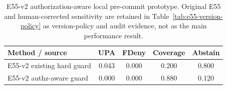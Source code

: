 \begin{table}[t]
\centering
\small
\caption{E55-v2 authorization-aware local pre-commit prototype. Original E55 and human-corrected sensitivity are retained in Table~\ref{tab:e55-version-policy} as version-policy and audit evidence, not as the main performance result.}
\label{tab:precommit}
\begin{tabular}{lcccc}
\toprule
Method / source & UPA & FDeny & Coverage & Abstain \\
\midrule
E55-v2 existing hard guard & 0.043 & 0.000 & 0.200 & 0.800 \\
E55-v2 authz-aware guard & 0.000 & 0.000 & 0.880 & 0.120 \\
\bottomrule
\end{tabular}
\end{table}
